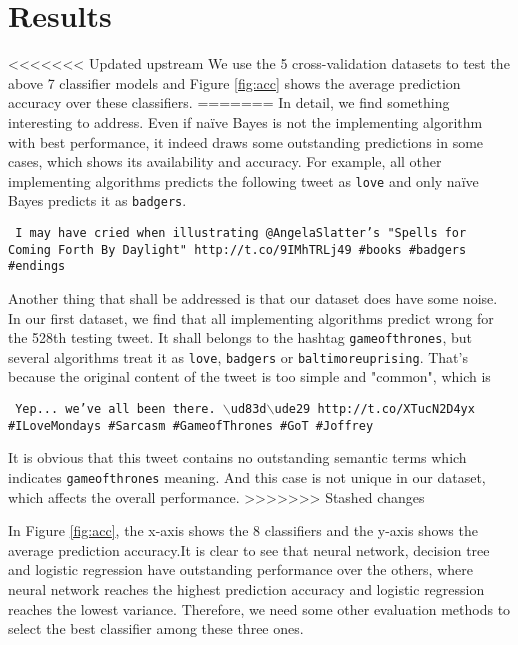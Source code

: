\documentclass[letterpaper,11pt,twocolumn]{article}
\begin{document}
\section{Results}
\label{sec:resu}
<<<<<<< Updated upstream
We use the 5 cross-validation datasets to test the above 7 classifier models and Figure \ref{fig:acc} shows the average prediction accuracy over these classifiers.
=======
In detail, we find something interesting to address. Even if na{\"i}ve Bayes is not the implementing algorithm with best performance, it indeed draws some outstanding predictions in some cases, which shows its availability and accuracy. For example, all other implementing algorithms predicts the following tweet as \texttt{love} and only na{\"i}ve Bayes predicts it as \texttt{badgers}.
\begin{framed}
\texttt{
I may have cried when illustrating @AngelaSlatter's "Spells for Coming Forth By Daylight" http://t.co/9IMhTRLj49 \#books \#badgers \#endings
}
\end{framed}
Another thing that shall be addressed is that our dataset does have some noise. In our first dataset, we find that all implementing algorithms predict wrong for the 528th testing tweet. It shall belongs to the hashtag \texttt{gameofthrones}, but several algorithms treat it as \texttt{love}, \texttt{badgers} or \texttt{baltimoreuprising}. That's because the original content of the tweet is too simple and "common", which is
\begin{framed}
\texttt{
Yep... we've all been there. $\backslash$ud83d$\backslash$ude29 http://t.co/XTucN2D4yx  \#ILoveMondays \#Sarcasm \#GameofThrones \#GoT \#Joffrey
}
\end{framed}
It is obvious that this tweet contains no outstanding semantic terms which indicates \texttt{gameofthrones} meaning. And this case is not unique in our dataset, which affects the overall performance.
>>>>>>> Stashed changes

\begin{figure*}[!htb]
\centering
{}
\caption{Average Prediction Accuracies of 8 Algorithms}
\label{fig:acc}
\end{figure*}

In Figure \ref{fig:acc}, the x-axis shows the 8 classifiers and the y-axis shows the average prediction accuracy.It is clear to see that neural network, decision tree and logistic regression have outstanding performance over the others, where neural network reaches the highest prediction accuracy and logistic regression reaches the lowest variance. Therefore, we need some other evaluation methods to select the best classifier among these three ones.
\end{document}
